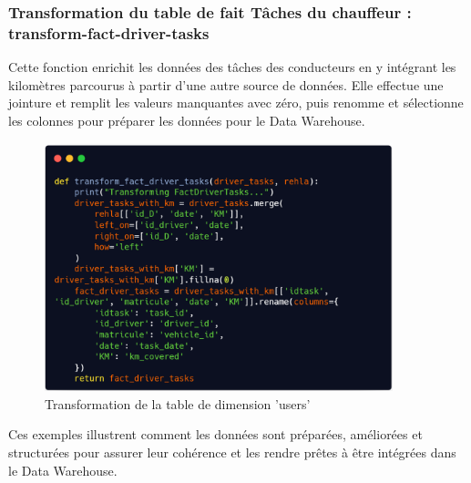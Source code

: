 \subsubsection{Transformation du table de fait Tâches du chauffeur : transform-fact-driver-tasks}
Cette fonction enrichit les données des tâches des conducteurs en y intégrant les kilomètres parcourus à partir d'une autre source de données. Elle effectue une jointure et remplit les valeurs manquantes avec zéro, puis renomme et sélectionne les colonnes pour préparer les données pour le Data Warehouse.


\begin{figure}[h!]

    \centering
    \includegraphics[width=0.9\textwidth]{chap6.images/trans fact driver task.png}
    \caption{ Transformation de la table de dimension 'users' }

\end{figure}

Ces exemples illustrent comment les données sont préparées, améliorées et structurées pour assurer leur cohérence et les rendre prêtes à être intégrées dans le Data Warehouse.

























\newpage

